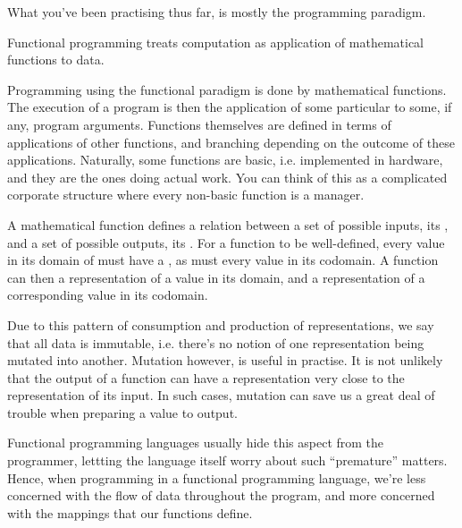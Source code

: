 
What you've been practising thus far, is mostly the 
programming paradigm.

\begin{definition}

Functional programming treats computation as application of mathematical
functions to  data.

\end{definition}

Programming using the functional paradigm is done by 
mathematical functions. The execution of a program is then the application of
some particular  to some, if any, program arguments.
Functions themselves are defined in terms of applications of other functions,
and branching depending on the outcome of these applications.  Naturally, some
functions are basic, i.e. implemented in hardware, and they are the ones doing
actual work. You can think of this as a complicated corporate structure where
every non-basic function is a manager.

A mathematical function defines a relation between a set of possible inputs,
its , and a set of possible outputs, its . For a
function to be well-defined, every value in its domain of must have a
, as must every value in its codomain\footnotemark.
A function can then  a representation of a value in its domain,
and  a representation of a corresponding value in its codomain.


Due to this pattern of consumption and production of representations, we say
that all data is immutable, i.e. there's no notion of one representation being
mutated into another. Mutation however, is useful in practise. It is not
unlikely that the output of a function can have a representation very close to
the representation of its input. In such cases, mutation can save us a great
deal of trouble when preparing a value to output.

Functional programming languages usually hide this aspect from the programmer,
lettting the language itself worry about such ``premature'' matters. Hence,
when programming in a functional programming language, we're less concerned
with the flow of data throughout the program, and more concerned with the
mappings that our functions define.
